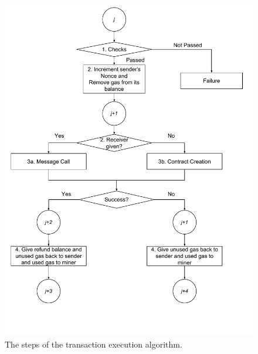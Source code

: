 \begin{figure}
	\begin{center}
		\includegraphics[width=\textwidth]{./res/img/transaction-execution.pdf}
	\end{center}
	\caption{The steps of the transaction execution algorithm.}
	\label{fig:tx:execution}
\end{figure}

